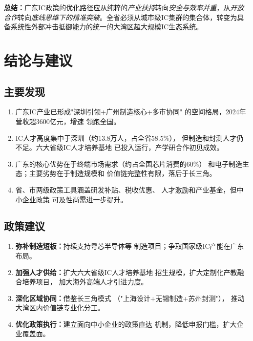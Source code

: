 \documentclass[12pt,a4paper]{article}
\begin{document}
\textbf{总结：}广东IC政策的优化路径应从纯粹的\textit{产业扶持}转向\textit{安全与效率并重}，从\textit{开放合作}转向\textit{底线思维下的精准突破}。全省必须从城市级IC集群的集合体，转变为具备系统性外部冲击抵御能力的统一的大湾区超大规模IC生态系统。

\section{结论与建议}
\label{sec:conclusion}

\subsection{主要发现}
\label{sec:findings}

\begin{enumerate}[label=(\arabic*)]
    \item 广东IC产业已形成"深圳引领+广州制造核心+多市协同"
          的空间格局，2024年营收超3600亿元，增速
          领跑全国。
    \item IC人才高度集中于深圳（约13.8万人，占全省58.5\%），
          但制造和封测人才仍不足。六大省级IC人才培养基地
          已投入运行，产学研合作初见成效。
    \item 广东的核心优势在于终端市场需求（约占全国芯片消费的60\%）
          和电子制造生态；主要劣势在于制造规模和
          价值链完整性有限，落后于长三角。
    \item 省、市两级政策工具涵盖研发补贴、税收优惠、
          人才激励和产业基金，但中小企业政策
          可及性尚需进一步提升。
\end{enumerate}

\subsection{政策建议}
\label{sec:recommendations}

\begin{enumerate}[label=(\arabic*)]
    \item \textbf{弥补制造短板：}持续支持粤芯半导体等
          制造项目；争取国家级IC产能在广东布局。
    \item \textbf{加强人才供给：}扩大六大省级IC人才培养基地
          招生规模，扩大定制化产教融合培养项目，
          加大海外高端人才引进力度。
    \item \textbf{深化区域协同：}借鉴长三角模式
          （"上海设计+无锡制造+苏州封测"），
          推动大湾区内价值链专业化分工。
    \item \textbf{优化政策执行：}建立面向中小企业的政策直达
          机制，降低申报门槛，扩大企业覆盖面。
\end{enumerate}
\end{document}
